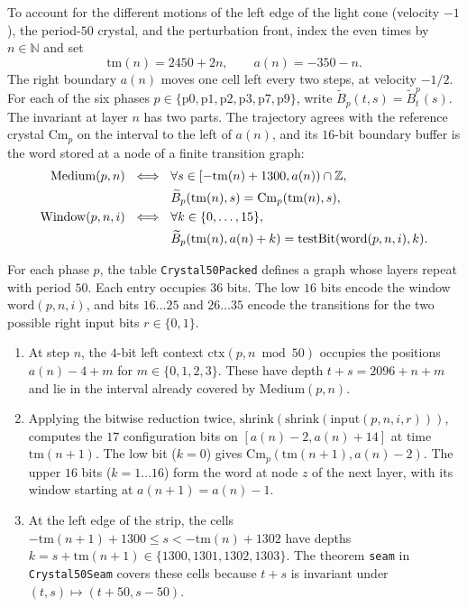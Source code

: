 To account for the different motions of the left edge of the light cone (velocity $-1$), the period-$50$ crystal, and the perturbation front, index the even times by $n \in \mathbb{N}$ and set
\begin{equation}
\mathrm{tm}(n) = 2450 + 2n, \qquad a(n) = -350 - n.
\end{equation}
The right boundary $a(n)$ moves one cell left every two steps, at velocity $-1/2$. For each of the six phases $p \in \{\mathrm{p0}, \mathrm{p1}, \mathrm{p2}, \mathrm{p3}, \mathrm{p7}, \mathrm{p9}\}$, write $\widetilde B_p(t,s)=\widetilde B^p_t(s)$. The invariant at layer $n$ has two parts. The trajectory agrees with the reference crystal $\mathrm{Cm}_p$ on the interval to the left of $a(n)$, and its $16$-bit boundary buffer is the word stored at a node of a finite transition graph:
\begin{align}
\mathrm{Medium}(p,n)\ \iff\ {}&
\forall s\in[-\mathrm{tm}(n)+1300,a(n))\cap\mathbb{Z},\notag\\
&\widetilde B_p(\mathrm{tm}(n),s)=\mathrm{Cm}_p(\mathrm{tm}(n),s), \\
\mathrm{Window}(p,n,i)\ \iff\ {}&
\forall k\in\{0,\dots,15\},\notag\\
&\widetilde B_p(\mathrm{tm}(n),a(n)+k)=\mathrm{testBit}(\mathrm{word}(p,n,i),k).
\end{align}

\begin{lemma}\label{lem:transducer}
For each phase $p$, the table \texttt{Crystal50Packed} defines a graph whose layers repeat with period $50$. Each entry occupies $36$ bits. The low $16$ bits encode the window $\mathrm{word}(p, n, i)$, and bits $16\dots 25$ and $26\dots 35$ encode the transitions for the two possible right input bits $r \in \{0, 1\}$.
\begin{enumerate}[label=(\alph*)]
    \item At step $n$, the $4$-bit left context $\mathrm{ctx}(p, n \bmod 50)$ occupies the positions $a(n) - 4 + m$ for $m \in \{0, 1, 2, 3\}$. These have depth $t + s = 2096 + n + m$ and lie in the interval already covered by $\mathrm{Medium}(p, n)$.
    \item Applying the bitwise reduction twice, $\mathrm{shrink}(\mathrm{shrink}(\mathrm{input}(p, n, i, r)))$, computes the $17$ configuration bits on $[a(n)-2, a(n)+14]$ at time $\mathrm{tm}(n+1)$. The low bit ($k=0$) gives $\mathrm{Cm}_p(\mathrm{tm}(n+1), a(n) - 2)$. The upper $16$ bits ($k=1\dots 16$) form the word at node $z$ of the next layer, with its window starting at $a(n+1) = a(n) - 1$.
    \item At the left edge of the strip, the cells $-\mathrm{tm}(n+1) + 1300 \le s < -\mathrm{tm}(n) + 1302$ have depths $k = s + \mathrm{tm}(n+1) \in \{1300,1301,1302,1303\}$. The theorem \texttt{seam} in \texttt{Crystal50Seam} covers these cells because $t + s$ is invariant under $(t, s) \mapsto (t + 50, s - 50)$.
\end{enumerate}
\end{lemma}

